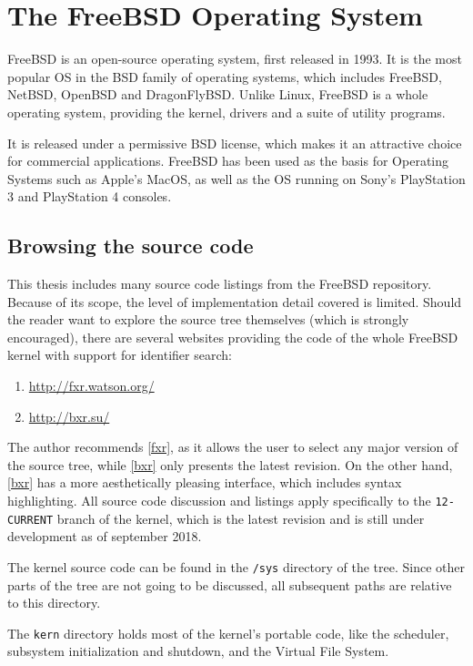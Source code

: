 \documentclass[shortabstract, english]{iithesis}
\begin{document}
\section{The FreeBSD Operating System}

FreeBSD \cite{bib:freebsd} is an open-source operating system, first released in
1993. It is the most popular OS in the BSD family of operating systems, which
includes FreeBSD, NetBSD, OpenBSD and DragonFlyBSD. Unlike Linux, FreeBSD is a
whole operating system, providing the kernel, drivers and a suite of utility
programs.

It is released under a permissive BSD license, which makes it an attractive
choice for commercial applications. FreeBSD has been used as the basis for
Operating Systems such as Apple's MacOS, as well as the OS running on Sony's
PlayStation 3 and PlayStation 4 consoles.

\subsection{Browsing the source code}

This thesis includes many source code listings from the FreeBSD repository.
Because of its scope, the level of implementation detail covered is limited.
Should the reader want to explore the source tree themselves (which is strongly
encouraged), there are several websites providing the code of the whole FreeBSD
kernel with support for identifier search:
\begin{enumerate}[label=\textnormal{(\arabic*)}]
\item \url{http://fxr.watson.org/}\label{fxr}
\item \url{http://bxr.su/}\label{bxr}
\end{enumerate}

The author recommends \ref{fxr}, as it allows the user to select any major
version of the source tree, while \ref{bxr} only presents the latest revision.
On the other hand, \ref{bxr} has a more aesthetically pleasing interface, which
includes syntax highlighting. All source code discussion and listings apply
specifically to the \texttt{12-CURRENT} branch of the kernel, which is the
latest revision and is still under development as of september 2018.

The kernel source code can be found in the \texttt{/sys} directory of the tree.
Since other parts of the tree are not going to be discussed, all subsequent
paths are relative to this directory.

The \texttt{kern} directory holds most of the kernel's portable code, like the
scheduler, subsystem initialization and shutdown, and the Virtual File System.
\end{document}
